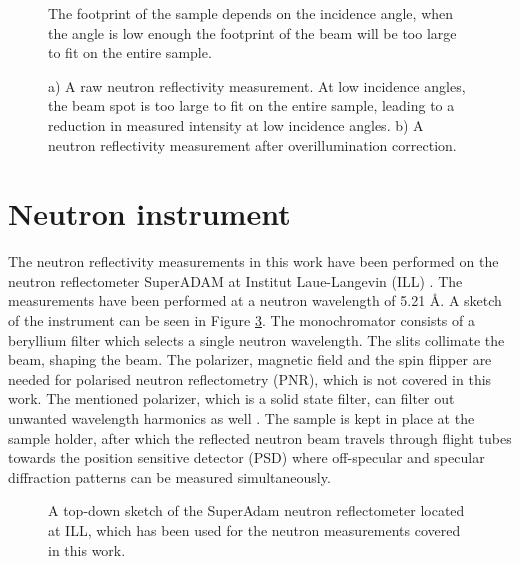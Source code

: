 \begin{figure}
	\centering
	\def\svgwidth{\textwidth}
	
	\caption{The footprint of the sample depends on the incidence angle, when the angle is low enough the footprint of the beam will be too large to fit on the entire sample.}
	\label{footprint_effect}
\end{figure}
\begin{figure}
	\centering
	\def\svgwidth{\textwidth}
	
	\caption{a) A raw neutron reflectivity measurement. At low incidence angles, the beam spot is too large to fit on the entire sample, leading to a reduction in measured intensity at low incidence angles. b) A neutron reflectivity measurement after overillumination correction.}
	\label{raw_measurement}
\end{figure}
\clearpage
\section{Neutron instrument}
The neutron reflectivity measurements in this work have been performed on the neutron reflectometer SuperADAM at Institut Laue-Langevin (ILL) \cite{superadam}.  The measurements have been performed at a neutron wavelength of 5.21 Å. A sketch of the instrument can be seen in Figure \ref{superadamsketch}.  The monochromator consists of a beryllium filter which selects a single neutron wavelength. The slits collimate the beam, shaping the beam. The polarizer, magnetic field and the spin flipper are needed for polarised neutron reflectometry (PNR), which is not covered in this work. The mentioned polarizer, which is a solid state filter, can filter out unwanted wavelength harmonics as well \cite{superadam}. The sample is kept in place at the sample holder, after which the reflected neutron beam travels through flight tubes towards the position sensitive detector (PSD) where off-specular and specular diffraction patterns can be measured simultaneously. 
\begin{figure}[b]
	\centering
	\def\svgwidth{\textwidth}
	
	\caption{A top-down sketch of the SuperAdam neutron reflectometer located at ILL, which has been used for the neutron measurements covered in this work.}
\label{superadamsketch}
\end{figure}

